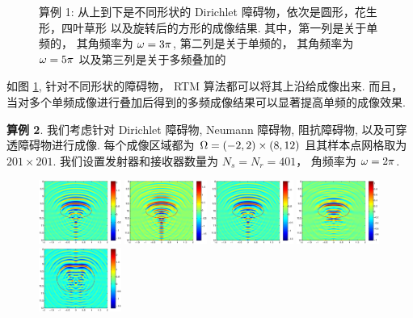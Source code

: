{\begin{figure}[htbp]
	\caption{算例 1: 从上到下是不同形状的 Dirichlet 障碍物，依次是圆形，花生形，四叶草形 以及旋转后的方形的成像结果. 其中，第一列是关于单频的， 其角频率为 $\omega=3\pi$, 第二列是关于单频的， 其角频率为 $\omega=5\pi$ 以及第三列是关于多频叠加的}\label{figure_21}
\end{figure}
如图 \ref{figure_21}, 针对不同形状的障碍物， RTM 算法都可以将其上沿给成像出来. 而且， 当对多个单频成像进行叠加后得到的多频成像结果可以显著提高单频的成像效果.

\bigskip
\textbf{算例 2}.
我们考虑针对 Dirichlet 障碍物,  Neumann 障碍物, 阻抗障碍物, 以及可穿透障碍物进行成像. 每个成像区域都为 $\Omega=(-2,2) \times (8, 12)$ 且其样本点网格取为 $201 \times 201$. 我们设置发射器和接收器数量为 $N_s = N_r = 401$， 角频率为 $\omega=2\pi$. 
\begin{figure}[htbp]
	\centering
	\includegraphics[width=0.24\textwidth]{./Img/graphic/circle_3pi.eps}
	\includegraphics[width=0.24\textwidth]{./Img/graphic/circle_3pi_neumann.eps}
	\includegraphics[width=0.24\textwidth]{./Img/graphic/circle_3pi_impedance_1.eps}
	\includegraphics[width=0.24\textwidth]{./Img/graphic/circle_3pi_transmission.eps}
	\includegraphics[width=0.24\textwidth]{./Img/graphic/peanut_3pi.eps}

\end{figure}}
